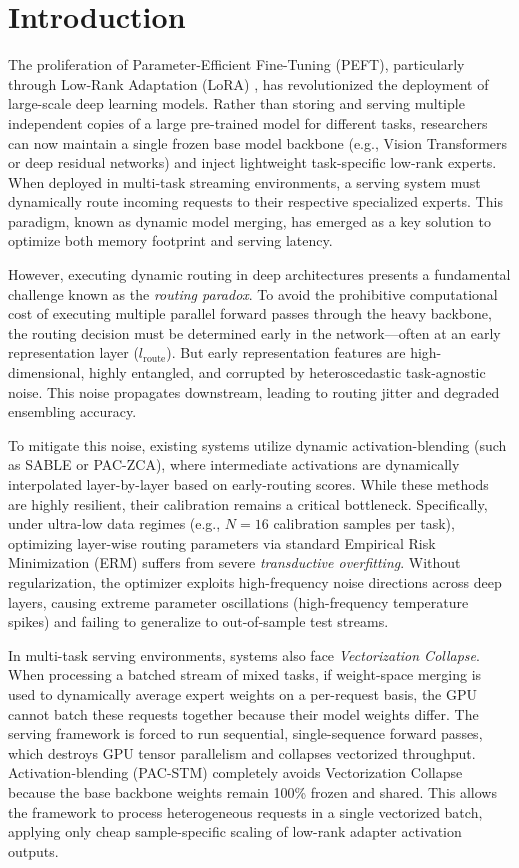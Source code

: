 \section{Introduction}
\label{sec:intro}

The proliferation of Parameter-Efficient Fine-Tuning (PEFT), particularly through Low-Rank Adaptation (LoRA) \cite{hu21lora}, has revolutionized the deployment of large-scale deep learning models. Rather than storing and serving multiple independent copies of a large pre-trained model for different tasks, researchers can now maintain a single frozen base model backbone (e.g., Vision Transformers or deep residual networks) and inject lightweight task-specific low-rank experts. 
When deployed in multi-task streaming environments, a serving system must dynamically route incoming requests to their respective specialized experts. This paradigm, known as dynamic model merging, has emerged as a key solution to optimize both memory footprint and serving latency.

However, executing dynamic routing in deep architectures presents a fundamental challenge known as the \emph{routing paradox}. To avoid the prohibitive computational cost of executing multiple parallel forward passes through the heavy backbone, the routing decision must be determined early in the network---often at an early representation layer ($l_{\text{route}}$). But early representation features are high-dimensional, highly entangled, and corrupted by heteroscedastic task-agnostic noise. This noise propagates downstream, leading to routing jitter and degraded ensembling accuracy.

To mitigate this noise, existing systems utilize dynamic activation-blending (such as SABLE or PAC-ZCA), where intermediate activations are dynamically interpolated layer-by-layer based on early-routing scores. While these methods are highly resilient, their calibration remains a critical bottleneck. Specifically, under ultra-low data regimes (e.g., $N=16$ calibration samples per task), optimizing layer-wise routing parameters via standard Empirical Risk Minimization (ERM) suffers from severe \emph{transductive overfitting}. Without regularization, the optimizer exploits high-frequency noise directions across deep layers, causing extreme parameter oscillations (high-frequency temperature spikes) and failing to generalize to out-of-sample test streams.

In multi-task serving environments, systems also face \emph{Vectorization Collapse}. When processing a batched stream of mixed tasks, if weight-space merging is used to dynamically average expert weights on a per-request basis, the GPU cannot batch these requests together because their model weights differ. The serving framework is forced to run sequential, single-sequence forward passes, which destroys GPU tensor parallelism and collapses vectorized throughput. Activation-blending (PAC-STM) completely avoids Vectorization Collapse because the base backbone weights remain 100\% frozen and shared. This allows the framework to process heterogeneous requests in a single vectorized batch, applying only cheap sample-specific scaling of low-rank adapter activation outputs.

